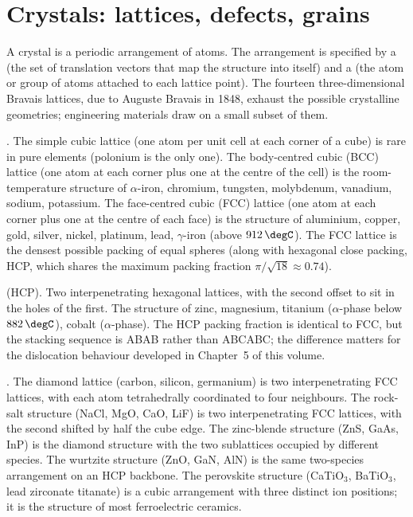 \section{Crystals: lattices, defects, grains}

A crystal is a periodic arrangement of atoms. The arrangement is
specified by a  (the set of translation
vectors that map the structure into itself) and a  (the
atom or group of atoms attached to each lattice point). The fourteen
three-dimensional Bravais lattices, due to Auguste Bravais in 1848,
exhaust the possible crystalline geometries; engineering materials
draw on a small subset of them.

. The simple cubic lattice (one atom per unit
cell at each corner of a cube) is rare in pure elements (polonium is
the only one). The body-centred cubic (BCC) lattice (one atom at each
corner plus one at the centre of the cell) is the room-temperature
structure of $\alpha$-iron, chromium, tungsten, molybdenum, vanadium,
sodium, potassium. The face-centred cubic (FCC) lattice (one atom at
each corner plus one at the centre of each face) is the structure of
aluminium, copper, gold, silver, nickel, platinum, lead, $\gamma$-iron
(above $912\,\degC$). The FCC lattice is the densest possible packing
of equal spheres (along with hexagonal close packing, HCP, which
shares the maximum packing fraction $\pi/\sqrt{18} \approx 0.74$).

 (HCP). Two interpenetrating hexagonal
lattices, with the second offset to sit in the holes of the first.
The structure of zinc, magnesium, titanium ($\alpha$-phase below
$882\,\degC$), cobalt ($\alpha$-phase). The HCP packing fraction is
identical to FCC, but the stacking sequence is ABAB rather than ABCABC;
the difference matters for the dislocation behaviour developed in
Chapter~5 of this volume.

. The diamond lattice (carbon, silicon,
germanium) is two interpenetrating FCC lattices, with each atom
tetrahedrally coordinated to four neighbours. The rock-salt structure
(NaCl, MgO, CaO, LiF) is two interpenetrating FCC lattices, with the
second shifted by half the cube edge. The zinc-blende structure (ZnS,
GaAs, InP) is the diamond structure with the two sublattices occupied
by different species. The wurtzite structure (ZnO, GaN, AlN) is the
same two-species arrangement on an HCP backbone. The perovskite
structure (CaTiO$_3$, BaTiO$_3$, lead zirconate titanate) is a
cubic arrangement with three distinct ion positions; it is the
structure of most ferroelectric ceramics.

